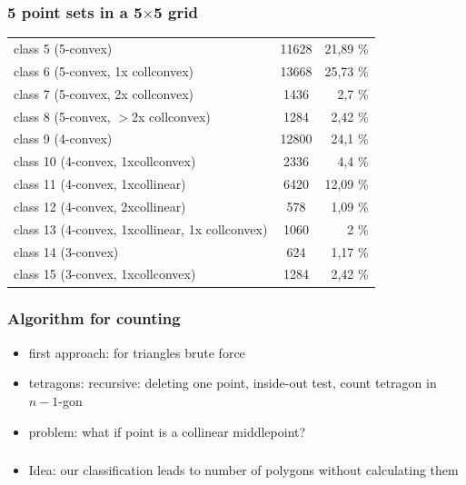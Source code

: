 \begin{frame}
\frametitle{5 point sets in a 5$\times$5 grid}
\begin{tabular}{l c r}
 class 5 (5-convex)                              &   11628   & 21,89 \% \\
 class 6 (5-convex, 1x collconvex)               &   13668   & 25,73 \%\\
 class 7 (5-convex, 2x collconvex)               &    1436   & 2,7 \% \\
 class 8 (5-convex, $>$2x collconvex)              &    1284 & 2,42 \% \\
 class 9 (4-convex)                              &   12800   & 24,1 \% \\
 class 10 (4-convex, 1xcollconvex)               &    2336   & 4,4 \% \\
 class 11 (4-convex, 1xcollinear)                &    6420   & 12,09 \% \\
 class 12 (4-convex, 2xcollinear)                &     578   & 1,09 \% \\
 class 13 (4-convex, 1xcollinear, 1x collconvex) &    1060   & 2 \% \\
 class 14 (3-convex)                             &     624   & 1,17 \% \\
 class 15 (3-convex, 1xcollconvex)               &    1284   & 2,42 \%
\end{tabular}
\end{frame}


\begin{frame}
\frametitle{Algorithm for counting}
\begin{itemize}
\item first approach: for triangles brute force
\item tetragons:  recursive: deleting one point, inside-out test, count tetragon in $n-1$-gon 
\item problem: what if point is a collinear middlepoint?
\end{itemize}
\end{frame}

\begin{frame}
\frametitle{}
\begin{itemize}
 \item Idea: our classification leads to number of polygons without calculating them
\end{itemize}
\end{frame}

